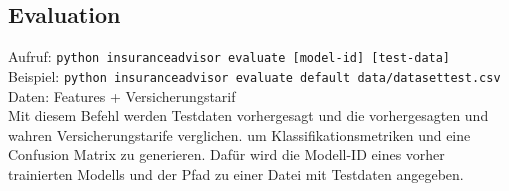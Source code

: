 \subsection{Evaluation}\label{sec:evaluation}
Aufruf: \texttt{python insurance\textunderscore advisor evaluate [model-id] [test-data]} \\
Beispiel: \texttt{python insurance\textunderscore advisor evaluate default data/dataset\textunderscore test.csv} \\
Daten: Features + Versicherungstarif \\
Mit diesem Befehl werden Testdaten vorhergesagt und die vorhergesagten und wahren Versicherungstarife verglichen. um Klassifikationsmetriken und eine Confusion Matrix zu generieren. Dafür wird die Modell-ID eines vorher trainierten Modells und der Pfad zu einer Datei mit Testdaten angegeben.


